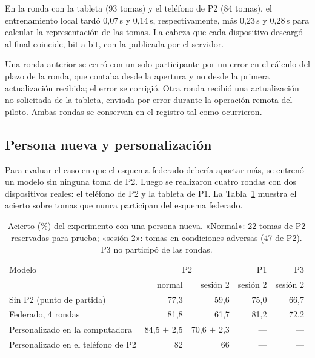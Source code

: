 En la ronda con la tableta (93 tomas) y el teléfono de P2 (84 tomas), el entrenamiento local tardó 0,07\,s y 0,14\,s, respectivamente, más 0,23\,s y 0,28\,s para calcular la representación de las tomas. La cabeza que cada dispositivo descargó al final coincide, bit a bit, con la publicada por el servidor.

Una ronda anterior se cerró con un solo participante por un error en el cálculo del plazo de la ronda, que contaba desde la apertura y no desde la primera actualización recibida; el error se corrigió. Otra ronda recibió una actualización no solicitada de la tableta, enviada por error durante la operación remota del piloto. Ambas rondas se conservan en el registro tal como ocurrieron.

\subsection{Persona nueva y personalización}

Para evaluar el caso en que el esquema federado debería aportar más, se entrenó un modelo sin ninguna toma de P2. Luego se realizaron cuatro rondas con dos dispositivos reales: el teléfono de P2 y la tableta de P1. La Tabla~\ref{tab:federado-sin-p2} muestra el acierto sobre tomas que nunca participan del esquema federado.

\begin{table}[h]
    \centering
    \small
    \begin{tabular}{lrrrr}
        \toprule
        Modelo & \multicolumn{2}{c}{P2} & P1 & P3 \\
        & normal & sesión 2 & sesión 2 & sesión 2 \\
        \midrule
        Sin P2 (punto de partida) & 77,3 & 59,6 & 75,0 & 66,7 \\
        Federado, 4 rondas & 81,8 & 61,7 & 81,2 & 72,2 \\
        Personalizado en la computadora & 84,5 $\pm$ 2,5 & 70,6 $\pm$ 2,3 & --- & --- \\
        Personalizado en el teléfono de P2 & 82 & 66 & --- & --- \\
        \bottomrule
    \end{tabular}
    \caption{Acierto (\%) del experimento con una persona nueva. «Normal»: 22 tomas de P2 reservadas para prueba; «sesión 2»: tomas en condiciones adversas (47 de P2). P3 no participó de las rondas.}
    \label{tab:federado-sin-p2}
\end{table}

